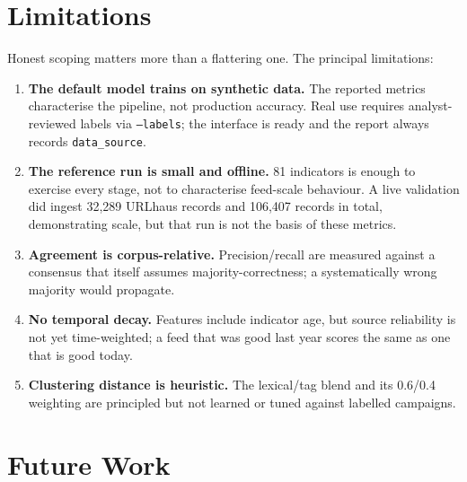 \documentclass[11pt,a4paper]{article}
\newcommand{\code}[1]{\texttt{\small #1}}
\begin{document}
\section{Limitations}

Honest scoping matters more than a flattering one. The principal limitations:

\begin{enumerate}[leftmargin=1.4em,itemsep=3pt]
  \item \textbf{The default model trains on synthetic data.} The reported
    metrics characterise the pipeline, not production accuracy. Real use
    requires analyst-reviewed labels via \code{--labels}; the interface is ready
    and the report always records \code{data\_source}.
  \item \textbf{The reference run is small and offline.} 81 indicators is enough
    to exercise every stage, not to characterise feed-scale behaviour. A live
    validation did ingest 32{,}289 URLhaus records and 106{,}407 records in
    total, demonstrating scale, but that run is not the basis of these metrics.
  \item \textbf{Agreement is corpus-relative.} Precision/recall are measured
    against a consensus that itself assumes majority-correctness; a
    systematically wrong majority would propagate.
  \item \textbf{No temporal decay.} Features include indicator age, but source
    reliability is not yet time-weighted; a feed that was good last year scores
    the same as one that is good today.
  \item \textbf{Clustering distance is heuristic.} The lexical/tag blend and its
    0.6/0.4 weighting are principled but not learned or tuned against labelled
    campaigns.
\end{enumerate}

\section{Future Work}
\end{document}
